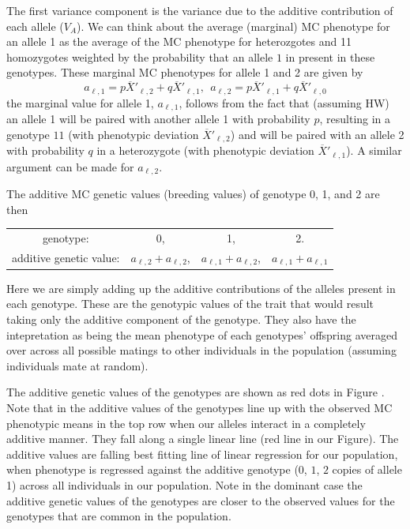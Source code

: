 The first variance component is the variance due to
the additive contribution of each allele ($V_A$). 
We can think about the average
(marginal) MC
phenotype for an allele 1 as the average of the MC phenotype
for heterozgotes and 11 homozygotes weighted by the probability that
an allele $1$ in present in these genotypes. 
These marginal MC
phenotypes for allele 1 and 2 are given by 
\begin{equation} 
a_{\ell, 1} = p\overline{X}'_{\ell,2}  + q\overline{X}'_{\ell,1}, ~~ a_{\ell, 2} = p\overline{X}'_{\ell,1}  + q\overline{X}'_{\ell,0} 
\end{equation}
the marginal value for allele 1, $a_{\ell, 1}$,  follows from the fact that (assuming HW) an allele 1 will be
paired with another allele 1 with probability $p$, resulting in a
genotype $11$ (with phenotypic deviation $\overline{X}'_{\ell,2}$) and will
be paired with an allele 2 with probability $q$ in a heterozygote
(with phenotypic deviation $\overline{X}'_{\ell,1}$). A similar argument
can be made for $a_{\ell, 2}$. 

The additive MC genetic values (breeding values) of genotype 0, 1, and
2 are then 
\begin{center}
\begin{tabular}{cccc}
genotype: & 0, & 1, & 2.\\
additive genetic value: & $a_{\ell,2}+ a_{\ell,2}$, & $a_{\ell,1}+a_{\ell,2}$, & $a_{\ell,1}+a_{\ell,1}$   \label{add_values}
\end{tabular}
\end{center}
Here we are
simply adding up the additive contributions of the alleles present in
each genotype. These are the genotypic values of the trait that would
result taking only the additive component of the genotype. 
They also have the intepretation as being the mean phenotype of each
genotypes' offspring averaged over across all possible matings
to other individuals in the population (assuming individuals mate at random). 

The additive genetic values of the genotypes are shown as red dots in
Figure \label{fig:add_dom}. Note that in the additive values of the
genotypes line up with the observed MC phenotypic means in the top row
when our alleles interact in a completely additive manner. They fall
along a single linear line (red line in our Figure). The additive values are falling
best fitting line of linear regression for our population, when phenotype is regressed
against the additive genotype ($0$, $1$, $2$ copies of allele 1)
across all individuals in our population. Note in the
dominant case the additive genetic values of the genotypes are closer
to the observed values for the genotypes that are common in the
population. \\

